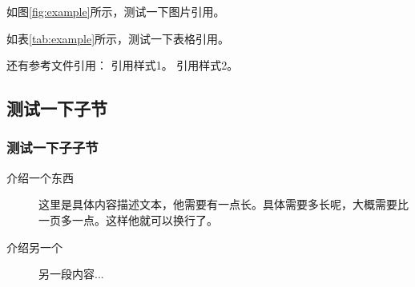 如图\ref{fig:example}所示，测试一下图片引用。

如表\ref{tab:example}所示，测试一下表格引用。

还有参考文件引用：
引用样式1\cite{example2025}。
引用样式2\parencite{example2025}。

\subsection{测试一下子节}
\subsubsection{测试一下子子节}

\begin{description}
    \item[介绍一个东西] 这里是具体内容描述文本，他需要有一点长。具体需要多长呢，大概需要比一页多一点。这样他就可以换行了。
    \item[介绍另一个] 另一段内容...
\end{description}